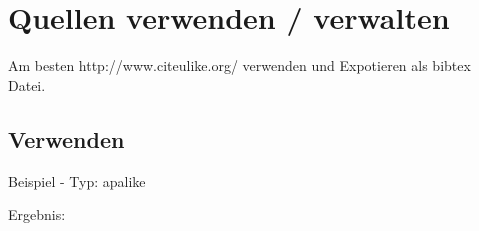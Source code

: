 
\chapter{Quellen verwenden / verwalten}

Am besten http://www.citeulike.org/ verwenden und Expotieren als bibtex Datei.


\section{Verwenden}

Beispiel - Typ: apalike


Ergebnis: \cite{haase}